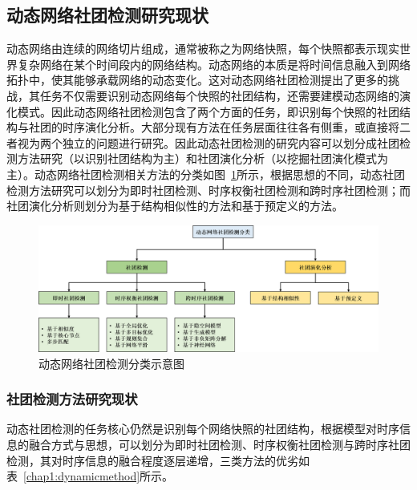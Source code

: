 
\subsection{动态网络社团检测研究现状}

动态网络由连续的网络切片组成，通常被称之为网络快照，每个快照都表示现实世界复杂网络在某个时间段内的网络结构。动态网络的本质是将时间信息融入到网络拓扑中，使其能够承载网络的动态变化。这对动态网络社团检测提出了更多的挑战，其任务不仅需要识别动态网络每个快照的社团结构，还需要建模动态网络的演化模式。因此动态网络社团检测包含了两个方面的任务，即识别每个快照的社团结构与社团的时序演化分析\cite{rossetti2018community}。大部分现有方法在任务层面往往各有侧重，或直接将二者视为两个独立的问题进行研究。因此动态社团检测的研究内容可以划分成社团检测方法研究（以识别社团结构为主）和社团演化分析（以挖掘社团演化模式为主）\cite{rossetti2018community}。动态网络社团检测相关方法的分类如图~\ref{chap1:fig:dcdclasses}所示，根据思想的不同，动态社团检测方法研究可以划分为即时社团检测、时序权衡社团检测和跨时序社团检测；而社团演化分析则划分为基于结构相似性的方法和基于预定义的方法。
\begin{figure}
    \centering
    \includegraphics[width=\linewidth]{figures/chap01/classification of dcd.png}
    \caption{动态网络社团检测分类示意图}
    \label{chap1:fig:dcdclasses}
\end{figure}

\subsubsection{社团检测方法研究现状}

动态社团检测的任务核心仍然是识别每个网络快照的社团结构，根据模型对时序信息的融合方式与思想，可以划分为即时社团检测、时序权衡社团检测与跨时序社团检测，其对时序信息的融合程度逐层递增，三类方法的优劣如表~\ref{chap1:dynamicmethod}所示。

